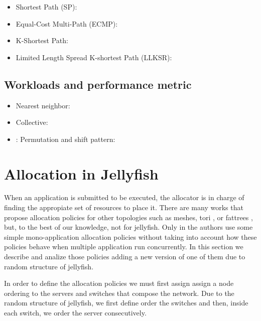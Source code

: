 \documentclass{sig-alternate}
\begin{document}
\begin{itemize}
    \item Shortest Path (SP):
    \item Equal-Cost Multi-Path (ECMP):
    \item K-Shortest Path:
    \item Limited Length Spread K-shortest Path (LLKSR):
\end{itemize}

\subsection{Workloads and performance metric}
\label{subsec:workloads}

\begin{itemize}
    \item Nearest neighbor:
    \item Collective:
    \item: Permutation and shift pattern:
\end{itemize}

\section{Allocation in Jellyfish}
\label{allocation}

When an application is submitted to be executed, the allocator is in charge of finding the appropiate set of resources to place it. There are many works that propose allocation policies for other topologies such as meshes, tori \cite{tori} \cite{toritree}, or fattrees \cite{toritree} \cite{trees}, but, to the best of our knowledge, not for jellyfish. Only in \cite{llksp} the authors use some simple mono-application allocation policies without taking into account how these policies behave when multiple application run concurrently. In this section we describe and analize those policies adding a new version of one of them due to random structure of jellyfish.

In order to define the allocation policies we must first assign assign a node ordering to the servers and switches that compose the network. Due to the random structure of jellyfish, we first define order the switches and then, inside each switch, we order the server consecutively.
\end{document}
